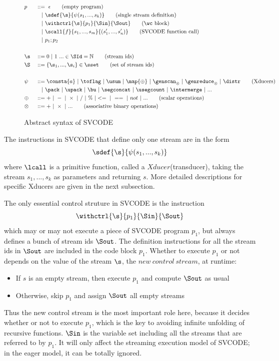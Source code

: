 \begin{figure}[!h] \large
	\begin{alignat*}{2}
	&p  && :: = \ \epsilon \tag{empty program}\\ 
	&   && \quad | \ \sdef{\s}{\psi(s_1,...,s_k)}  \tag{single stream definition}\\
	&   && \quad | \ \withctrl{\s}{p_1}{\Sin}{\Sout}  \tag{\wc block}\\
	&   && \quad | \ \scall{f}{s_1,...,s_m}{(s_1',...,s_n')} \tag{SVCODE function call}\\
	&   && \quad | \ p_1;p_2  \\
	\\
	&\s && ::= 0 \ | \ 1 \ ... \in \SId  = \mathbb{N}   \tag{stream ids}\\
	&  \S && ::= \{\s_1,..., \s_i\} \in \sset  \tag{set of stream ids}\\
	\\
	& \psi \ && ::= \consta{a} \ | \ \toflag  
	\ | \ \usum \ | \ \map{\oplus} \ | \ \genscan_{\otimes} \ | \ \genreduce_{\otimes} \ | \ \distr  \tag{Xducers}  \\
    &   && \quad | \ \pack \ | \ \upack \ | \ \bu \ | \ \segconcat \ | \ \usegcount \ | \ \intermerge \ | \ ...  \\
    & \oplus  \ && :: = + \ | \ - \ | \ \times \ |  \  / \ | \ \% \ | <= \ | \ == \ | \  \*{not} \ | \ ... \tag{scalar operations} \\
    & \otimes \ && :: = + \ | \ \times  \ | \ ...  \tag{associative binary operations} \\
	\end{alignat*}
	\caption{Abstract syntax of SVCODE \label{fig-svcode1-gram}}
\end{figure}


The instructions in SVCODE that define only one stream are in the form
$$\sdef{\s}{\psi(s_1,...,s_k)} $$  
where $\lcall$ is a primitive function, called a $Xducer$(transducer), taking the stream $s_1,...,s_k$ as parameters and returning $s$. 
More detailed descriptions for specific Xducers are given in the next subsection.


The only essential control struture in SVCODE is the \wc instruction 
$$\withctrl{\s}{p_1}{\Sin}{\Sout} $$
which may or may not execute a piece of SVCODE program $p_1$, but always defines a bunch of stream ids $\Sout$.
The definition instructions for all the stream ids in $\Sout$ are included in the code block $p_1$. 
Whether to execute $p_1$ or not depends on the value of the stream $\s$, the $new \ control \ stream$, at runtime:
\begin{itemize}
	\item If $s$ is an empty stream, then execute $p_1$ and compute $\Sout$ as usual
	\item Otherwise, skip $p_1$ and assign $\Sout$ all empty streams 
\end{itemize}
Thus the new control stream is the most important role here, because it decides whether or not to execute $p_1$, which is the key to avoiding infinite unfolding of recursive functions.  
$\Sin$ is the variable set including all the streams that are referred to by $p_1$. 
It will only affect the streaming execution model of SVCODE; in the eager model, it can be totally ignored.

